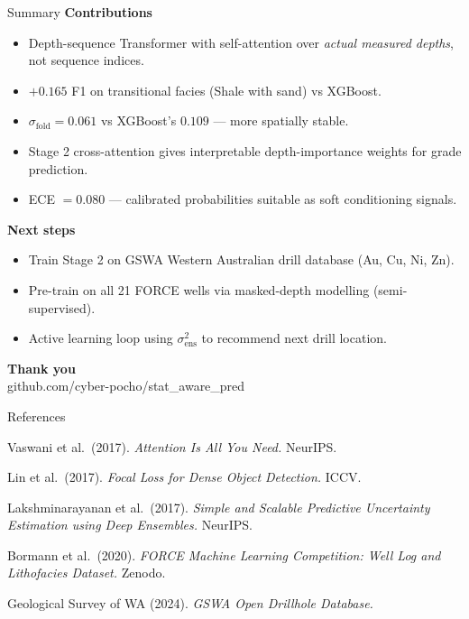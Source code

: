 \documentclass[aspectratio=169,11pt]{beamer}
\newcommand{\acc}[1]{{\color{Accent}#1}}
\newcommand{\mut}[1]{{\color{Muted}#1}}
\begin{document}
\begin{frame}{Summary}
  \textbf{Contributions}
  \begin{itemize}
    \item Depth-sequence Transformer with self-attention over \emph{actual measured depths}, not sequence indices.
    \item \acc{$+0.165$ F1} on transitional facies (Shale with sand) vs XGBoost.
    \item \acc{$\sigma_\text{fold} = 0.061$} vs XGBoost's $0.109$ — more spatially stable.
    \item Stage 2 cross-attention gives interpretable depth-importance weights for grade prediction.
    \item ECE $= 0.080$ — calibrated probabilities suitable as soft conditioning signals.
  \end{itemize}

  \vspace{0.8em}
  \textbf{Next steps}
  \begin{itemize}
    \item Train Stage 2 on GSWA Western Australian drill database (Au, Cu, Ni, Zn).
    \item Pre-train on all 21 FORCE wells via masked-depth modelling (semi-supervised).
    \item Active learning loop using $\sigma^2_\text{ens}$ to recommend next drill location.
  \end{itemize}
\end{frame}

{
\begin{frame}[plain]
  \vfill
  \begin{center}
    {\Large\acc{\textbf{Thank you}}}\\[1em]
    \mut{github.com/cyber-pocho/stat\_aware\_pred}
  \end{center}
  \vfill
\end{frame}}

\begin{frame}{References}
  \begin{footnotesize}
  \setlength{\parskip}{0.5em}

  Vaswani et al.\ (2017). \emph{Attention Is All You Need.} NeurIPS.

  Lin et al.\ (2017). \emph{Focal Loss for Dense Object Detection.} ICCV.

  Lakshminarayanan et al.\ (2017). \emph{Simple and Scalable Predictive Uncertainty Estimation using Deep Ensembles.} NeurIPS.

  Bormann et al.\ (2020). \emph{FORCE Machine Learning Competition: Well Log and Lithofacies Dataset.} Zenodo.

  Geological Survey of WA (2024). \emph{GSWA Open Drillhole Database.}
  \end{footnotesize}
\end{frame}
\end{document}

